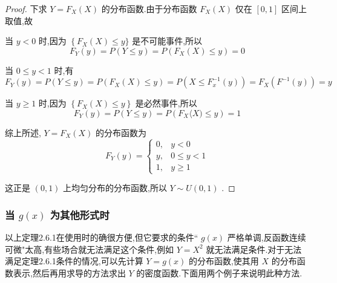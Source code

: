 \begin{proof}
	下求 $ Y=F_{X}(X) $ 的分布函数.由于分布函数 $ F_{X}(X) $ 仅在 $ [0,1] $ 区间上取值,故
	
	当 $ y<0 $ 时,因为 $ \left\{F_{X}(X) \leqslant y\right.\} $ 是不可能事件,所以 
	\[
	F_{Y}(y)=P(Y \leqslant y)=P\left(F_{X}(X) \leqslant y\right)=0
	\]
	
	当 $ 0 \leqslant y<1 $ 时,有
	\[
	F_{Y}(y)=P(Y \leqslant y)=P\left(F_{X}(X) \leqslant y\right)=P\left(X \leqslant F_{x}^{-1}(y)\right)=F_{X}\left(F^{-1}(y)\right)=y
	\]
	
	当 $ y \geqslant 1 $ 时,因为 $ \left\{F_{X}(X) \leqslant y\right\} $ 是必然事件,所以
	\[
	F_{Y}(y)=P(Y \leqslant y)=P\left(F_{X}\langle X) \leqslant y\right)=1
	\]
	
	综上所述, $ Y=F_{X}(X) $ 的分布函数为
	\[
	F_{Y}(y)=\left\{\begin{array}{ll}{0,} & {y<0} \\ {y,} & {0 \leqslant y<1} \\ {1,} & {y \geqslant 1}\end{array}\right.
	\]
	
	这正是 $ (0,1) $ 上均匀分布的分布函数,所以 $ Y \sim U(0,1) $ .
\end{proof}

\subsubsection{当 $ g(x) $ 为其他形式时}

以上定理2.6.1在使用时的确很方便,但它要求的条件`` $ g(x) $ 严格单调,反函数连续可微"太高,有些场合就无法满足这个条件,例如 $ Y=X^{2} $ 就无法满足条件.对于无法满足定理2.6.1条件的情况,可以先计算 $ Y=g(x) $ 的分布函数,使其用 $ X $ 的分布函数表示,然后再用求导的方法求出 $ Y $ 的密度函数.下面用两个例子来说明此种方法.

